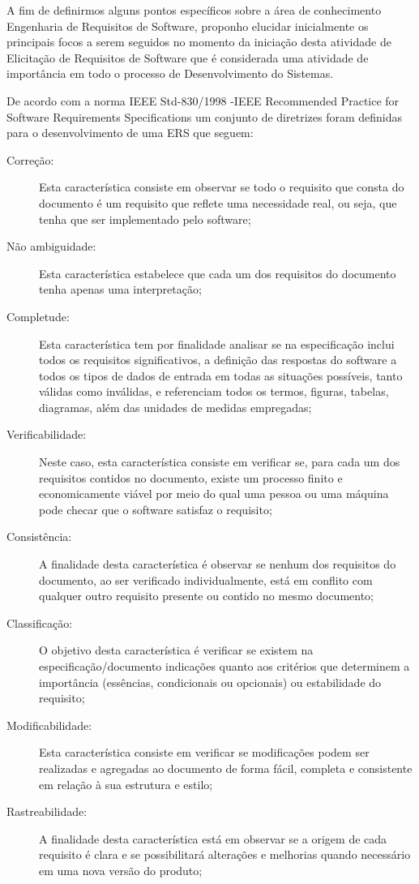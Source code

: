A fim de definirmos alguns pontos específicos sobre a área de conhecimento Engenharia de Requisitos de Software, proponho elucidar inicialmente os principais focos a serem seguidos no momento da iniciação desta atividade de Elicitação de Requisitos de Software que é considerada uma atividade de importância em todo o processo de Desenvolvimento do Sistemas. 

De acordo com a norma IEEE Std-830/1998 -IEEE Recommended Practice for Software Requirements Specifications \cite{IEEE830-1998} um conjunto de diretrizes foram definidas para o desenvolvimento de uma ERS que seguem:
\begin{description}
\item [Correção:] Esta característica consiste em observar se todo o requisito que consta do documento é um requisito que reflete uma necessidade real, ou seja, que tenha que ser implementado pelo software;
\item [Não ambiguidade:] Esta característica estabelece que cada um dos requisitos do documento tenha apenas uma interpretação; 
\item [Completude:] Esta característica tem por finalidade analisar se na especificação inclui todos os requisitos significativos, a definição das respostas do software a todos os tipos de dados de entrada em todas as situações possíveis, tanto válidas como inválidas, e referenciam todos os termos, figuras, tabelas, diagramas, além das unidades de medidas empregadas; 
\item[Verificabilidade:] Neste caso, esta característica consiste em verificar se, para cada um dos requisitos contidos no documento, existe um processo finito e economicamente viável por meio do qual uma pessoa ou uma máquina pode checar que o software satisfaz o requisito; 
\item[Consistência:] A finalidade desta característica é observar se nenhum dos requisitos do documento, ao ser verificado individualmente, está em conflito com qualquer outro requisito presente ou contido no mesmo documento; 
\item[Classificação:] O objetivo desta característica é verificar se existem na especificação/documento indicações quanto aos critérios que determinem a importância (essências, condicionais ou opcionais) ou estabilidade do requisito; 
\item[Modificabilidade:] Esta característica consiste em verificar se modificações podem ser realizadas e agregadas ao documento de forma fácil, completa e consistente em relação à  sua estrutura e estilo; 
\item[Rastreabilidade:] A finalidade desta característica está em observar se a origem de cada requisito é clara e se possibilitará alterações e melhorias quando necessário em uma nova versão do produto;
\end{description}

